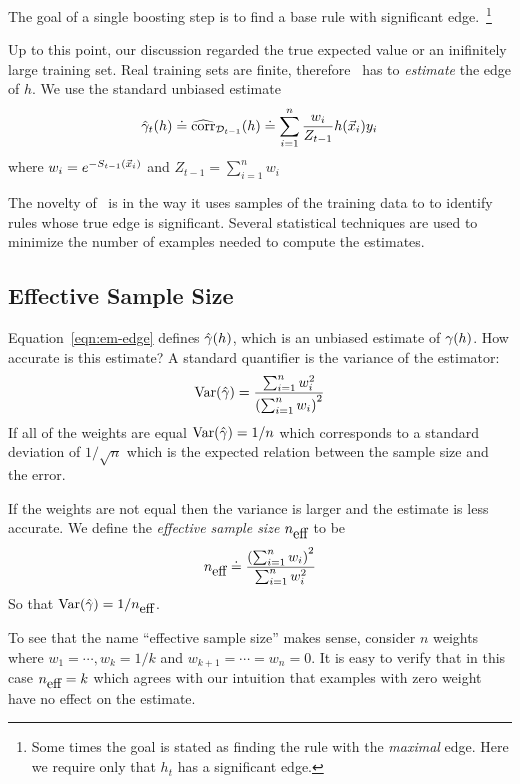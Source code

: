 The goal of a single boosting step is to find a base rule with
significant edge.~\footnote{Some times the goal is stated as
  finding the rule with the {\em maximal} edge.  Here we require only
  that $h_t$ has a significant edge.}

Up to this point, our discussion regarded the true expected value or
an inifinitely large training set. Real training sets are finite, 
therefore \Sparrow\ has to {\em
  estimate} the edge of $h$. We use the standard unbiased estimate
\begin{equation} \label{eqn:emp-edge}
\hat{\gamma}_{t}(h) \doteq \widehat{\mbox{corr}}_{{\cal D}_{t-1}}(h)
\doteq 
\sum_{i=1}^n \frac{w_i}{Z_{t-1}} h(\vec{x}_i) y_i
\end{equation}
where  $w_i = e^{-S_{t-1}(\vec{x}_i)}$ and $Z_{t-1} = \sum_{i=1}^n w_i$

The novelty of \Sparrow\ is in the way it uses samples of the training
data to to identify rules whose true edge is significant.
Several statistical techniques are used to minimize the number of
examples needed to compute the estimates.

\subsection{Effective Sample Size}
\label{sec:effectiveSampleSize}
Equation~\ref{eqn:em-edge} defines $\hat{\gamma}(h)$, which is an
unbiased estimate of $\gamma(h)$. How accurate is this estimate? A
standard quantifier is the variance of the estimator:
\begin{equation} \label{eqn:variance}
 \mbox{Var}(\hat{\gamma}) = \frac{\sum_{i=1}^n w_i^2}{\left(\sum_{i=1}^n w_i\right)^2}
\end{equation}
If all of the weights are equal $\mbox{Var}(\hat{\gamma}) = 1/n$ which
corresponds to a standard deviation of $1/\sqrt{n}$ which is the
expected relation between the sample size and the error.

If the weights are not equal then the variance is larger and the
estimate is less accurate. We define the {\em effective sample size}
${n_{\mbox{eff}}}$ to be
\begin{equation} \label{eqn:neff}
  {n_{\mbox{eff}}} \doteq \frac{\left(\sum_{i=1}^n w_i\right)^2}{\sum_{i=1}^n w_i^2}
\end{equation}
So that $\mbox{Var}(\hat{\gamma}) = 1/{n_{\mbox{eff}}}$.

To see that the name ``effective sample size'' makes sense, consider
$n$ weights where $w_1=\cdots,w_k=1/k$ and
$w_{k+1}=\cdots=w_{n}=0$. It is easy to verify that in this case
${n_{\mbox{eff}}}=k$ which agrees with our intuition that examples with zero
weight have no effect on the estimate.

